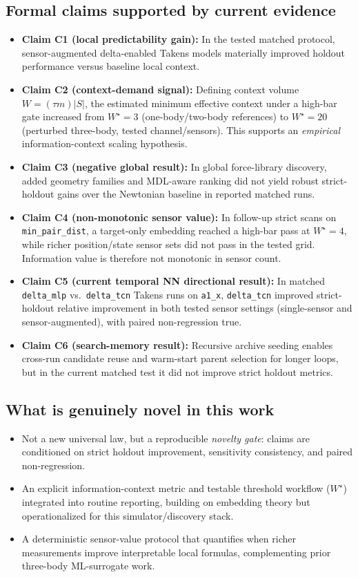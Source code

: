 \documentclass[11pt]{article}
\begin{document}
\subsection*{Formal claims supported by current evidence}
\begin{itemize}
\item \textbf{Claim C1 (local predictability gain):} In the tested matched protocol, sensor-augmented delta-enabled Takens models materially improved holdout performance versus baseline local context.
\item \textbf{Claim C2 (context-demand signal):} Defining context volume $W=(\tau m)|S|$, the estimated minimum effective context under a high-bar gate increased from $W^\star=3$ (one-body/two-body references) to $W^\star=20$ (perturbed three-body, tested channel/sensors). This supports an \emph{empirical} information-context scaling hypothesis.
\item \textbf{Claim C3 (negative global result):} In global force-library discovery, added geometry families and MDL-aware ranking did not yield robust strict-holdout gains over the Newtonian baseline in reported matched runs.
\item \textbf{Claim C4 (non-monotonic sensor value):} In follow-up strict scans on \texttt{min\_pair\_dist}, a target-only embedding reached a high-bar pass at $W^\star=4$, while richer position/state sensor sets did not pass in the tested grid. Information value is therefore not monotonic in sensor count.
\item \textbf{Claim C5 (current temporal NN directional result):} In matched \texttt{delta\_mlp} vs.\ \texttt{delta\_tcn} Takens runs on \texttt{a1\_x}, \texttt{delta\_tcn} improved strict-holdout relative improvement in both tested sensor settings (single-sensor and sensor-augmented), with paired non-regression true.
\item \textbf{Claim C6 (search-memory result):} Recursive archive seeding enables cross-run candidate reuse and warm-start parent selection for longer loops, but in the current matched test it did not improve strict holdout metrics.
\end{itemize}

\subsection*{What is genuinely novel in this work}
\begin{itemize}
\item Not a new universal law, but a reproducible \emph{novelty gate}: claims are conditioned on strict holdout improvement, sensitivity consistency, and paired non-regression.
\item An explicit information-context metric and testable threshold workflow ($W^\star$) integrated into routine reporting, building on embedding theory but operationalized for this simulator/discovery stack\cite{Takens1981,Kennel1992,KennelAbarbanel2002}.
\item A deterministic sensor-value protocol that quantifies when richer measurements improve interpretable local formulas, complementing prior three-body ML-surrogate work\cite{Breen2020}.
\end{itemize}
\end{document}
